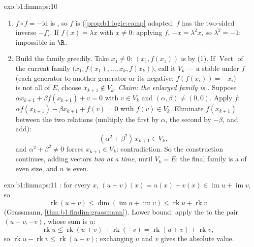 \begin{solution}{exo:b1:linmaps:10}
\begin{enumerate}
  \item $f \circ f = -\mathrm{id}$ is , so $f$ is
        (\cref{prop:b1:logic:comp} adapted: $f$ has the two-sided
        inverse $-f$). If $f(x) = \lambda x$ with $x \neq 0$:
        applying $f$, $-x = \lambda^2 x$, so $\lambda^2 = -1$:
        impossible in $\R$.
  \item Build the family greedily. Take $x_1 \neq 0$: $(x_1,
        f(x_1))$ is  by (1). If $\operatorname{Vect}$ of the
        current family $\bigl(x_1, f(x_1), \dots, x_k,
        f(x_k)\bigr)$, call it $V_k$ --- a  stable under $f$
        (each generator  to another generator or its negative:
        $f(f(x_i)) = -x_i$) --- is not all of $E$, choose $x_{k+1}
        \notin V_k$. \emph{Claim: the enlarged family is .}
        Suppose $\alpha x_{k+1} + \beta f(x_{k+1}) + v = 0$ with $v
        \in V_k$ and $(\alpha, \beta) \neq (0,0)$. Apply $f$:
        $\alpha f(x_{k+1}) - \beta x_{k+1} + f(v) = 0$ with $f(v)
        \in V_k$. Eliminate $f(x_{k+1})$ between the two relations
        (multiply the first by $\alpha$, the second by $-\beta$, and
        add):
        \[
        (\alpha^2 + \beta^2)\, x_{k+1} \in V_k ,
        \]
        and $\alpha^2 + \beta^2 \neq 0$ forces $x_{k+1} \in V_k$:
        contradiction. So the construction continues, adding vectors
        \emph{two at a time}, until $V_k = E$: the final family is a
         of even size, and $n$ is even.
\end{enumerate}
\end{solution}

\begin{solution}{exo:b1:linmaps:11}
: for every $x$, $(u + v)(x) = u(x) + v(x) \in
\operatorname{im} u + \operatorname{im} v$, so
\[
\operatorname{rk}(u + v)
\leq \dim(\operatorname{im} u + \operatorname{im} v)
\leq \operatorname{rk} u + \operatorname{rk} v
\]
(Grassmann, \cref{thm:b1:findim:grassmann}). Lower bound: apply
the  to the pair $(u + v, -v)$, whose sum is $u$:
\[
\operatorname{rk} u \leq \operatorname{rk}(u + v) +
\operatorname{rk}(-v) = \operatorname{rk}(u + v) +
\operatorname{rk} v,
\]
so $\operatorname{rk} u - \operatorname{rk} v \leq
\operatorname{rk}(u+v)$; exchanging $u$ and $v$ gives the absolute
value.
\end{solution}


